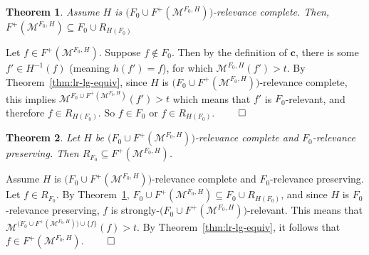 \documentclass[11pt,letterpaper]{article}
\newtheorem{theorem}{Theorem}[section]
\begin{document}
\begin{theorem}
\label{thm:subset-relevant}
Assume $H$ 
is 
$\big(F_0\cup F^+(\mathcal{M}^{F_0,H})\big)$-relevance 
complete.  Then, 
$F^+(\mathcal{M}^{F_0,H})\subseteq F_0\cup R_{H(F_0)}$
\end{theorem}

Let $f\in F^+(\mathcal{M}^{F_0,H})$.  Suppose 
$f\notin F_0$.  Then by the definition of $\mathbf{c}$,
there is some $f'\in H^{-1}(f)$ (meaning $h(f')=f$), 
for which $\mathcal{M}^{F_0,H}(f')>t$.  By 
Theorem~\ref{thm:lr-lg-equiv}, since 
$H$ is 
$\big(F_0\cup F^+(\mathcal{M}^{F_0,H})\big)$-relevance 
complete, this implies 
$\mathcal{M}^{F_0\cup F^+(\mathcal{M}^{F_0,H})}(f')>t$ 
which means that $f'$ is $F_0$-relevant, and therefore
$f\in R_{H(F_0)}$.  So $f\in F_0$ or $f\in R_{H(F_0)}$. $\qed$

\begin{theorem}
\label{thm:supset-relevant}
Let $H$ be 
$\big(F_0\cup F^+(\mathcal{M}^{F_0,H})\big)$-relevance 
complete and $F_0$-relevance preserving.  Then
$R_{F_0}\subseteq F^+(\mathcal{M}^{F_0,H})$.
\end{theorem}

Assume $H$ is $\big(F_0\cup F^+(\mathcal{M}^{F_0,H})\big)$-relevance complete and $F_0$-relevance preserving.  Let $f\in R_{F_0}$. 
By 
Theorem~\ref{thm:subset-relevant}, 
$F_0\cup F^+(\mathcal{M}^{F_0,H})\subseteq F_0\cup R_{H(F_0)}$,
and since $H$ is $F_0$-relevance preserving, $f$ is 
strongly-$\big(F_0\cup F^+(\mathcal{M}^{F_0,H})\big)$-relevant.  This means that 
$\mathcal{M}^{\big(F_0\cup F^+(\mathcal{M}^{F_0,H})\big)
\cup\{f\}}(f)>t$.  
By Theorem~\ref{thm:lr-lg-equiv}, it follows that
$f\in F^+(\mathcal{M}^{F_0,H})$. $\qed$







\end{document}
